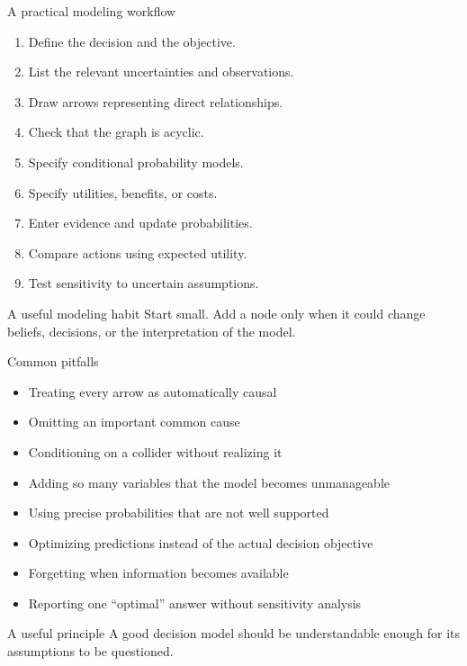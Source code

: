 \documentclass[aspectratio=43,11pt]{beamer}
\begin{document}
\begin{frame}{A practical modeling workflow}

\begin{enumerate}
  \item Define the decision and the objective.
  \item List the relevant uncertainties and observations.
  \item Draw arrows representing direct relationships.
  \item Check that the graph is acyclic.
  \item Specify conditional probability models.
  \item Specify utilities, benefits, or costs.
  \item Enter evidence and update probabilities.
  \item Compare actions using expected utility.
  \item Test sensitivity to uncertain assumptions.
\end{enumerate}

\medskip

\begin{block}{A useful modeling habit}
Start small. Add a node only when it could change beliefs, decisions,
or the interpretation of the model.
\end{block}

\end{frame}

\begin{frame}{Common pitfalls}

\begin{itemize}
  \item Treating every arrow as automatically causal
  \item Omitting an important common cause
  \item Conditioning on a collider without realizing it
  \item Adding so many variables that the model becomes unmanageable
  \item Using precise probabilities that are not well supported
  \item Optimizing predictions instead of the actual decision objective
  \item Forgetting when information becomes available
  \item Reporting one ``optimal'' answer without sensitivity analysis
\end{itemize}

\medskip

\begin{block}{A useful principle}
A good decision model should be understandable enough for its
assumptions to be questioned.
\end{block}

\end{frame}
\end{document}
